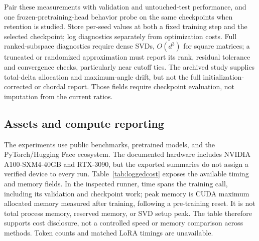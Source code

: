 \documentclass{article}
\begin{document}
Pair these measurements with validation and untouched-test performance, and one frozen-pretraining-head behavior probe on the same checkpoints when retention is studied. Store per-seed values at both a fixed training step and the selected checkpoint; log diagnostics separately from optimization costs. Full ranked-subspace diagnostics require dense SVDs, $O(d^3)$ for square matrices; a truncated or randomized approximation must report its rank, residual tolerance and convergence checks, particularly near cutoff ties. The archived study supplies total-delta allocation and maximum-angle drift, but not the full initialization-corrected or chordal report. Those fields require checkpoint evaluation, not imputation from the current ratios.

\subsection{Assets and compute reporting}
\label{app:loggedcost}
The experiments use public benchmarks, pretrained models, and the PyTorch/Hugging Face ecosystem. The documented hardware includes NVIDIA A100-SXM4-40GB and RTX-3090, but the exported summaries do not assign a verified device to every run. Table~\ref{tab:loggedcost} exposes the available timing and memory fields. In the inspected runner, time spans the training call, including its validation and checkpoint work; peak memory is CUDA maximum allocated memory measured after training, following a pre-training reset. It is not total process memory, reserved memory, or SVD setup peak. The table therefore supports cost disclosure, not a controlled speed or memory comparison across methods. Token counts and matched LoRA timings are unavailable.
\end{document}
